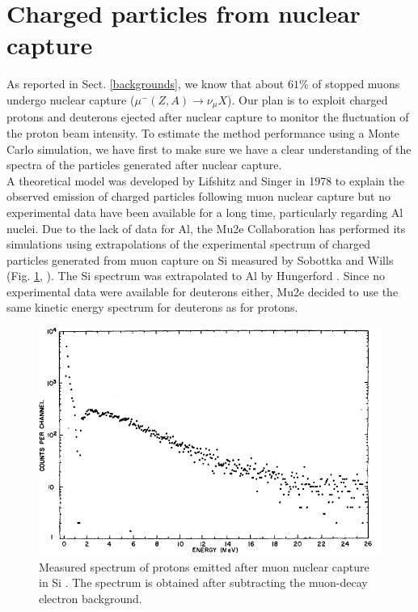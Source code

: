 \documentclass[12pt,a4paper,openright, oneside, titlepage]{book} %
\begin{document}
\section{Charged particles from nuclear capture}
As reported in Sect. \ref{backgrounds}, 
we know that about $61\%$ of stopped muons undergo nuclear capture ($\mu^-(Z,A)\rightarrow \nu_\mu X$). 
Our plan is to exploit charged protons and deuterons ejected after nuclear capture
to monitor the fluctuation of the proton beam intensity. 
To estimate the method performance using a Monte Carlo simulation,
we have first to make sure we have a clear understanding of the 
spectra of the particles generated after nuclear capture.\\
A theoretical model was developed by Lifshitz and Singer in 1978 \cite{Lifshitz} 
to explain the observed emission of charged particles following muon nuclear capture 
but no experimental data have been available for a long time, particularly regarding Al nuclei.
Due to the lack of data for Al, 
the Mu2e Collaboration has performed its simulations using extrapolations of the experimental spectrum 
of charged particles generated from muon capture on Si 
measured by Sobottka and Wills (Fig. \ref{_sobottka}, \cite{Sobottka}).
The Si spectrum was extrapolated to Al by Hungerford \cite{Hungerford}.
Since no experimental data were available for deuterons either, 
Mu2e decided to use the same kinetic energy spectrum for deuterons as for protons.

\begin{figure}
\centering
\includegraphics[scale=0.8]{sobottka}
\caption[Proton spectrum from nuclear capture in Si]{Measured spectrum of protons emitted after muon nuclear capture in Si \cite{Sobottka}. 
The spectrum is obtained after subtracting the muon-decay electron background.}
\label{_sobottka}
\end{figure}
\end{document}
